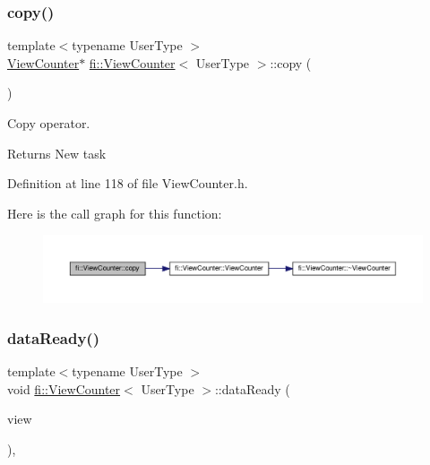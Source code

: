 \subsubsection{\texorpdfstring{copy()}{copy()}}
{\footnotesize\ttfamily template$<$typename User\+Type $>$ \\
\hyperlink{classfi_1_1ViewCounter}{View\+Counter}$\ast$ \hyperlink{classfi_1_1ViewCounter}{fi\+::\+View\+Counter}$<$ User\+Type $>$\+::copy (\begin{DoxyParamCaption}{ }\end{DoxyParamCaption})\hspace{0.3cm}{\ttfamily [inline]}}



Copy operator. 

\begin{DoxyReturn}{Returns}
New task 
\end{DoxyReturn}


Definition at line 118 of file View\+Counter.\+h.

Here is the call graph for this function\+:
\nopagebreak
\begin{figure}[H]
\begin{center}
\leavevmode
\includegraphics[width=350pt]{df/dae/classfi_1_1ViewCounter_a78ffe68387ffe83ce2135c9cd5cac033_cgraph}
\end{center}
\end{figure}
\mbox{\label{classfi_1_1ViewCounter_a20e96bdb97f1aecc5bb0a81fb456c0fc}} 
\subsubsection{\texorpdfstring{data\+Ready()}{dataReady()}}
{\footnotesize\ttfamily template$<$typename User\+Type $>$ \\
void \hyperlink{classfi_1_1ViewCounter}{fi\+::\+View\+Counter}$<$ User\+Type $>$\+::data\+Ready (\begin{DoxyParamCaption}\item[{htgs\+::m\+\_\+data\+\_\+t$<$ \hyperlink{classfi_1_1View}{fi\+::\+View}$<$ User\+Type $>$$>$}]{view }\end{DoxyParamCaption})\hspace{0.3cm}{\ttfamily [inline]}, {\ttfamily [private]}}



